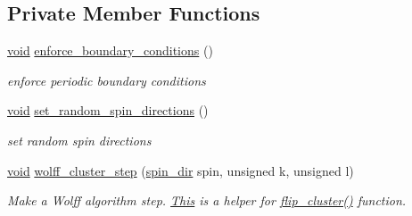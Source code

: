 \subsection*{Private Member Functions}
\begin{DoxyCompactItemize}
\item 
\mbox{\hyperlink{glad_8h_a950fc91edb4504f62f1c577bf4727c29}{void}} \mbox{\hyperlink{classIsingModel_abe2a720ca3ed7dde191e36fbf33561b3}{enforce\+\_\+boundary\+\_\+conditions}} ()
\begin{DoxyCompactList}\small\item\em enforce periodic boundary conditions \end{DoxyCompactList}\item 
\mbox{\hyperlink{glad_8h_a950fc91edb4504f62f1c577bf4727c29}{void}} \mbox{\hyperlink{classIsingModel_a6ab9293015326da93fb6e3e20d24edf8}{set\+\_\+random\+\_\+spin\+\_\+directions}} ()
\begin{DoxyCompactList}\small\item\em set random spin directions \end{DoxyCompactList}\item 
\mbox{\hyperlink{glad_8h_a950fc91edb4504f62f1c577bf4727c29}{void}} \mbox{\hyperlink{classIsingModel_a37758a1a4a2536d16f1bb8166e13f7b6}{wolff\+\_\+cluster\+\_\+step}} (\mbox{\hyperlink{classspin__dir}{spin\+\_\+dir}} spin, unsigned k, unsigned l)
\begin{DoxyCompactList}\small\item\em Make a Wolff algorithm step. \mbox{\hyperlink{classThis}{This}} is a helper for \mbox{\hyperlink{classIsingModel_ab76a4eee808eaa1979ff6707498e9908}{flip\+\_\+cluster()}} function. \end{DoxyCompactList}\end{DoxyCompactItemize}
